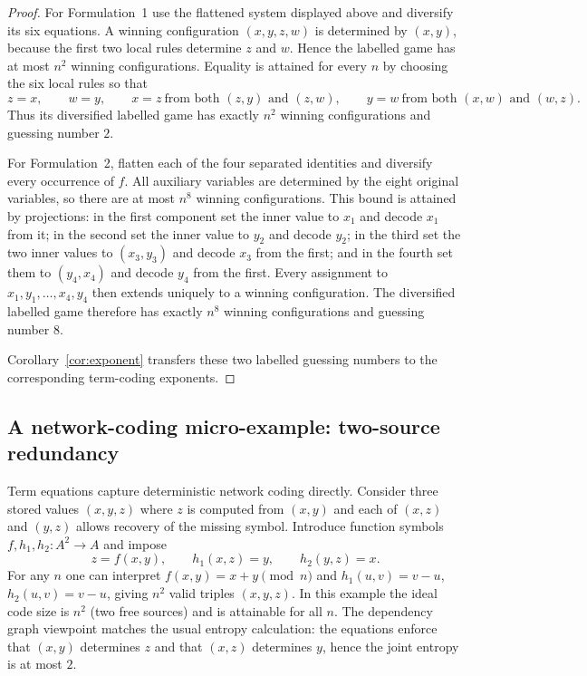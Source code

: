 \documentclass[11pt]{article}
\theoremstyle{plain}
\theoremstyle{definition}
\theoremstyle{definition}
\theoremstyle{remark}
\newcommand{\A}{A}
\begin{document}
\begin{proof}
For Formulation~1 use the flattened system displayed above and diversify its six equations.  A winning
configuration $(x,y,z,w)$ is determined by $(x,y)$, because the first two local rules determine $z$ and $w$.
Hence the labelled game has at most $n^2$ winning configurations.  Equality is attained for every $n$ by choosing
the six local rules so that
\[
  z=x,\qquad w=y,\qquad
  x=z\ \text{from both }(z,y)\text{ and }(z,w),\qquad
  y=w\ \text{from both }(x,w)\text{ and }(w,z).
\]
Thus its diversified labelled game has exactly $n^2$ winning configurations and guessing number $2$.

For Formulation~2, flatten each of the four separated identities and diversify every occurrence of $f$.
All auxiliary variables are determined by the eight original variables, so there are at most $n^8$ winning
configurations.  This bound is attained by projections: in the first component set the inner value to $x_1$ and
decode $x_1$ from it; in the second set the inner value to $y_2$ and decode $y_2$; in the third set the two inner
values to $(x_3,y_3)$ and decode $x_3$ from the first; and in the fourth set them to $(y_4,x_4)$ and decode $y_4$
from the first.  Every assignment to $x_1,y_1,\dots,x_4,y_4$ then extends uniquely to a winning configuration.
The diversified labelled game therefore has exactly $n^8$ winning configurations and guessing number $8$.

Corollary~\ref{cor:exponent} transfers these two labelled guessing numbers to the corresponding term-coding
exponents.
\end{proof}


\subsection{A network-coding micro-example: two-source redundancy}
\label{subsec:network-example}

Term equations capture deterministic network coding directly.
Consider three stored values $(x,y,z)$ where $z$ is computed from $(x,y)$ and each of $(x,z)$ and $(y,z)$
allows recovery of the missing symbol.
Introduce function symbols $f,h_1,h_2:\A^2\to\A$ and impose
\begin{equation}
\label{eq:network}
  z=f(x,y),\qquad h_1(x,z)=y,\qquad h_2(y,z)=x.
\end{equation}
For any $n$ one can interpret $f(x,y)=x+y\pmod n$ and $h_1(u,v)=v-u$, $h_2(u,v)=v-u$, giving $n^2$ valid
triples $(x,y,z)$.
In this example the ideal code size is $n^2$ (two free sources) and is attainable for all $n$.
The dependency graph viewpoint matches the usual entropy calculation: the equations enforce that $(x,y)$
determines $z$ and that $(x,z)$ determines $y$, hence the joint entropy is at most $2$.
\end{document}
